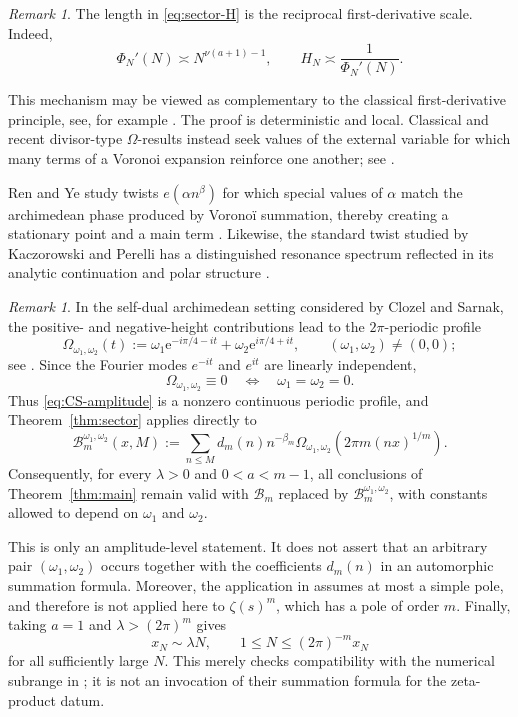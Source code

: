\documentclass[11pt]{amsart}
\theoremstyle{plain}
\theoremstyle{definition}
\theoremstyle{remark}
\newtheorem{remark}[theorem]{Remark}
\newcommand{\e}{\mathrm e}
\newcommand{\Bcal}{\mathcal B}
\numberwithin{equation}{section}
\begin{document}
\begin{remark}\label{rem:natural-scale}
The length in \eqref{eq:sector-H} is the reciprocal first-derivative scale.  Indeed,
\[
  \Phi_N'(N)\asymp N^{\nu(a+1)-1},
  \qquad
  H_N\asymp\frac1{\Phi_N'(N)}.
\]
\end{remark}

This mechanism may be viewed as complementary to the classical first-derivative principle, see, for example \cite{AriasDeReyna}.  The proof is deterministic and local.  Classical and recent divisor-type $\Omega$-results instead seek values of the external variable for which many terms of a Voronoi expansion
reinforce one another; see \cite{Soundararajan,Sourmelidis,Mahatab,Lamzouri,Jaasaari}. 

Ren and Ye study twists $e(\alpha n^\beta)$ for
which special values of $\alpha$ match the archimedean phase produced
by Vorono\"i summation, thereby creating a stationary point and a main
term \cite{RenYe2010,RenYe2015}.  Likewise, the standard twist studied
by Kaczorowski and Perelli has a distinguished resonance spectrum
reflected in its analytic continuation and polar structure
\cite{KaczorowskiPerelli}. 

\begin{remark}
\label{rem:CS-scope}
In the self-dual archimedean setting considered by Clozel and Sarnak,
the positive- and negative-height contributions lead to the
$2\pi$-periodic profile
\begin{equation}\label{eq:CS-amplitude}
  \Omega_{\omega_1,\omega_2}(t)
  :=
  \omega_1\e^{-i\pi/4-it}
  +
  \omega_2\e^{i\pi/4+it},
  \qquad
  (\omega_1,\omega_2)\ne(0,0);
\end{equation}
see \cite[Hypothesis~2.1, Lemma~2.1, and
(2.30)]{ClozelSarnak}.  Since the Fourier modes $e^{-it}$ and $e^{it}$
are linearly independent,
\[
  \Omega_{\omega_1,\omega_2}\equiv0
  \quad\Longleftrightarrow\quad
  \omega_1=\omega_2=0.
\]
Thus \eqref{eq:CS-amplitude} is a nonzero continuous periodic profile,
and Theorem~\ref{thm:sector} applies directly to
\[
  \Bcal_m^{\omega_1,\omega_2}(x,M)
  :=
  \sum_{n\le M}
  d_m(n)n^{-\beta_m}
  \Omega_{\omega_1,\omega_2}
  \!\left(2\pi m(nx)^{1/m}\right).
\]
Consequently, for every $\lambda>0$ and $0<a<m-1$, all conclusions of
Theorem~\ref{thm:main} remain valid with $\Bcal_m$ replaced by
$\Bcal_m^{\omega_1,\omega_2}$, with constants allowed to depend on
$\omega_1$ and $\omega_2$.

This is only an amplitude-level statement.  It does not assert that an
arbitrary pair $(\omega_1,\omega_2)$ occurs together with the
coefficients $d_m(n)$ in an automorphic summation formula.  Moreover,
the application in \cite{ClozelSarnak} assumes at most a simple pole,
and therefore is not applied here to $\zeta(s)^m$, which has a pole of
order $m$.  Finally, taking $a=1$ and
$\lambda>(2\pi)^m$ gives
\[
  x_N\sim\lambda N,
  \qquad
  1\le N\le(2\pi)^{-m}x_N
\]
for all sufficiently large $N$.  This merely checks compatibility
with the numerical subrange in
\cite[(2.30)]{ClozelSarnak}; it is not an invocation of their
summation formula for the zeta-product datum.
\end{remark}
\end{document}
